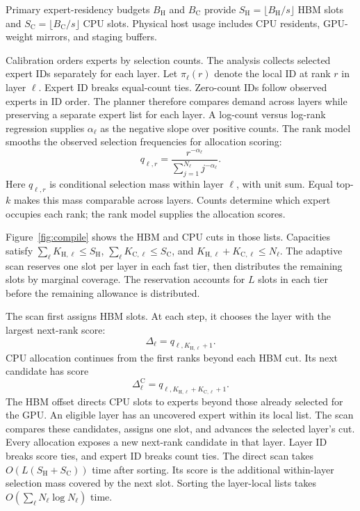 Primary expert-residency budgets $B_{\mathrm H}$ and $B_{\mathrm C}$ provide $S_{\mathrm H}=\lfloor B_{\mathrm H}/s\rfloor$ HBM slots and $S_{\mathrm C}=\lfloor B_{\mathrm C}/s\rfloor$ CPU slots.
Physical host usage includes CPU residents, GPU-weight mirrors, and staging buffers.

Calibration orders experts by selection counts.
The analysis collects selected expert IDs separately for each layer.
Let $\pi_\ell(r)$ denote the local ID at rank $r$ in layer $\ell$.
Expert ID breaks equal-count ties.
Zero-count IDs follow observed experts in ID order.
The planner therefore compares demand across layers while preserving a separate expert list for each layer.
A log-count versus log-rank regression supplies $\alpha_\ell$ as the negative slope over positive counts.
The rank model smooths the observed selection frequencies for allocation scoring:
\begin{equation}
q_{\ell,r}=\frac{r^{-\alpha_\ell}}{\sum_{j=1}^{N_\ell}j^{-\alpha_\ell}}.
\end{equation}
Here $q_{\ell,r}$ is conditional selection mass within layer $\ell$, with unit sum.
Equal top-$k$ makes this mass comparable across layers.
Counts determine which expert occupies each rank; the rank model supplies the allocation scores.

Figure~\ref{fig:compile} shows the HBM and CPU cuts in those lists.
Capacities satisfy $\sum_\ell K_{\mathrm H,\ell}\le S_{\mathrm H}$, $\sum_\ell K_{\mathrm C,\ell}\le S_{\mathrm C}$, and $K_{\mathrm H,\ell}+K_{\mathrm C,\ell}\le N_\ell$.
The adaptive scan reserves one slot per layer in each fast tier, then distributes the remaining slots by marginal coverage.
The reservation accounts for $L$ slots in each tier before the remaining allowance is distributed.

The scan first assigns HBM slots.
At each step, it chooses the layer with the largest next-rank score:
\begin{equation}
\Delta_\ell=q_{\ell,K_{\mathrm H,\ell}+1}.
\end{equation}
CPU allocation continues from the first ranks beyond each HBM cut.
Its next candidate has score
\begin{equation}
\Delta^{\mathrm C}_\ell=q_{\ell,K_{\mathrm H,\ell}+K_{\mathrm C,\ell}+1}.
\label{eq:cpu_marginal}
\end{equation}
The HBM offset directs CPU slots to experts beyond those already selected for the GPU.
An eligible layer has an uncovered expert within its local list.
The scan compares these candidates, assigns one slot, and advances the selected layer's cut.
Every allocation exposes a new next-rank candidate in that layer.
Layer ID breaks score ties, and expert ID breaks count ties.
The direct scan takes $O(L(S_{\mathrm H}+S_{\mathrm C}))$ time after sorting.
Its score is the additional within-layer selection mass covered by the next slot.
Sorting the layer-local lists takes $O(\sum_\ell N_\ell\log N_\ell)$ time.

